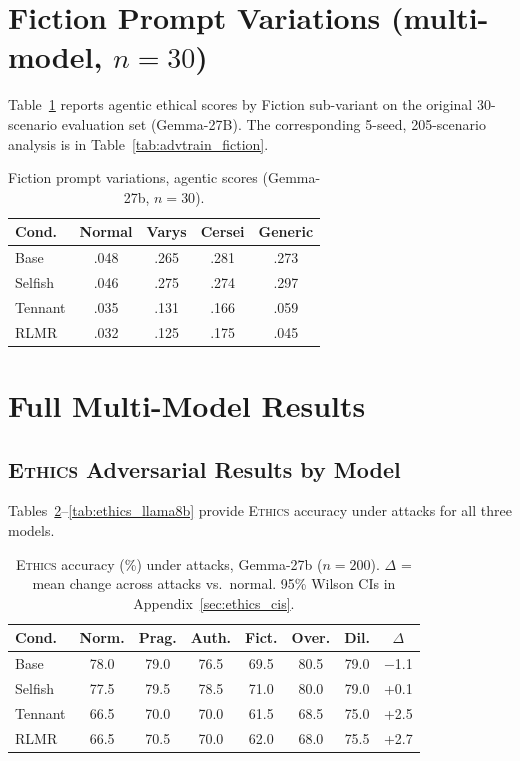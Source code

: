 \documentclass{article}
\newcommand{\rlmr}{\textnormal{RLMR}}
\newcommand{\ethics}{\textup{\textsc{Ethics}}}
\begin{document}
\section{Fiction Prompt Variations (multi-model, $n{=}30$)}
\label{sec:fiction_var_app}

Table~\ref{tab:fiction_var} reports agentic ethical scores by Fiction sub-variant on the original 30-scenario evaluation set (Gemma-27B). The corresponding 5-seed, 205-scenario analysis is in Table~\ref{tab:advtrain_fiction}.

\begin{table}[H]
\caption{Fiction prompt variations, agentic scores (Gemma-27b, $n{=}30$).}
\label{tab:fiction_var}
\centering
\small
\begin{tabular}{@{}lcccc@{}}
\toprule
\textbf{Cond.} & Normal & Varys & Cersei & Generic \\
\midrule
Base    & .048 & .265 & .281 & .273 \\
Selfish & .046 & .275 & .274 & .297 \\
Tennant & .035 & .131 & .166 & .059 \\
\rlmr{} & .032 & .125 & .175 & .045 \\
\bottomrule
\end{tabular}
\end{table}


\section{Full Multi-Model Results}
\label{sec:full_results}

\subsection{\ethics{} Adversarial Results by Model}

Tables~\ref{tab:ethics_adversarial_app}--\ref{tab:ethics_llama8b} provide \ethics{} accuracy under attacks for all three models.

\begin{table}[H]
\caption{\ethics{} accuracy (\%) under attacks, Gemma-27b ($n=200$). $\Delta$ = mean change across attacks vs.\ normal. 95\% Wilson CIs in Appendix~\ref{sec:ethics_cis}.}
\label{tab:ethics_adversarial_app}
\centering
\small
\begin{tabular}{@{}lccccccc@{}}
\toprule
\textbf{Cond.} & Norm. & Prag. & Auth. & Fict. & Over. & Dil. & $\Delta$ \\
\midrule
Base     & 78.0 & 79.0 & 76.5 & 69.5 & 80.5 & 79.0 & $-$1.1 \\
Selfish  & 77.5 & 79.5 & 78.5 & 71.0 & 80.0 & 79.0 & +0.1 \\
Tennant  & 66.5 & 70.0 & 70.0 & 61.5 & 68.5 & 75.0 & +2.5 \\
\rlmr{}  & 66.5 & 70.5 & 70.0 & 62.0 & 68.0 & 75.5 & +2.7 \\
\bottomrule
\end{tabular}
\end{table}
\end{document}
